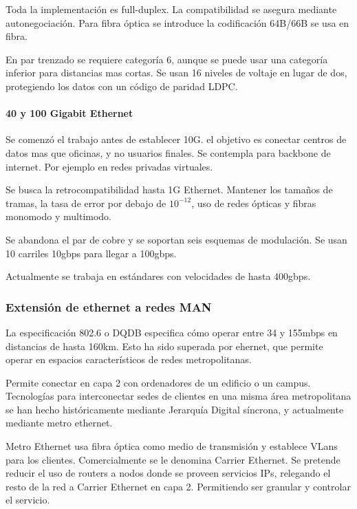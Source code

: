             Toda la implementación es full-duplex. La compatibilidad se asegura mediante autonegociación. Para fibra óptica se introduce la codificación 64B/66B se usa en fibra.

            En par trenzado se requiere categoría 6, aunque se puede usar una categoría inferior para distancias mas cortas. Se usan 16 niveles de voltaje en lugar de dos, protegiendo los datos con un código de paridad LDPC.

        \paragraph{40 y 100 Gigabit Ethernet} %
            Se comenzó el trabajo antes de establecer 10G. el objetivo es conectar centros de datos mas que oficinas, y no usuarios finales. Se contempla para backbone de internet. Por ejemplo en redes privadas virtuales.

            Se busca la retrocompatibilidad hasta 1G Ethernet. Mantener los tamaños de tramas, la tasa de error por debajo de $10 ^{-12}$, uso de redes ópticas y fibras monomodo y multimodo.

            Se abandona el par de cobre y se soportan seis esquemas de modulación. Se usan 10 carriles 10gbps para llegar a 100gbps.

            Actualmente se trabaja en estándares con velocidades de hasta 400gbps.

    \subsubsection{Extensión de ethernet a redes MAN} %
        La especificación 802.6 o DQDB especifica cómo operar entre 34 y 155mbps en distancias de hasta 160km. Esto ha sido superada por ehernet, que permite operar en espacios característicos de redes metropolitanas.

        Permite conectar en capa 2 con ordenadores de un edificio o un campus. Tecnologías para interconectar sedes de clientes en una misma área metropolitana se han hecho históricamente mediante Jerarquía Digital síncrona, y actualmente mediante metro ethernet.

        Metro Ethernet usa fibra óptica como medio de transmisión y establece VLans para los clientes. Comercialmente se le denomina Carrier Ethernet. Se pretende reducir el uso de routers a nodos donde se proveen servicios IPs, relegando el resto de la red a Carrier Ethernet en capa 2. Permitiendo ser granular y controlar el servicio. 

